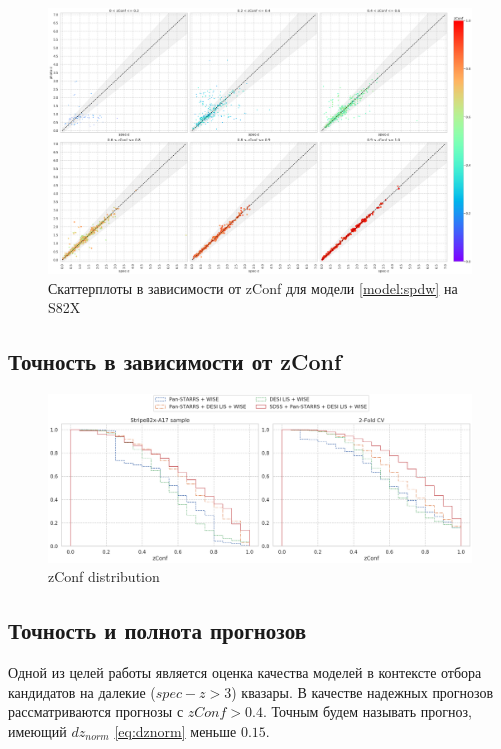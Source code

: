 \documentclass[fleqn,usenatbib]{mnras}
\begin{document}
\begin{figure}
    \centering
    \includegraphics[width=0.99\linewidth]{images/zconf-scatterplot-35-s82x.png}
    \caption{Скаттерплоты в зависимости от zConf для модели \ref{model:spdw} на S82X}
    \label{fig:zconf-scatterplot-35}
\end{figure}

\subsection{Точность в зависимости от zConf}

\begin{figure}
    \centering
    \includegraphics[width=0.9\linewidth]{images/zconf-cal.png}
    \caption{zConf distribution}
    \label{fig:zconf-cal-dr16q}
\end{figure}

\clearpage

\subsection{Точность и полнота прогнозов}\label{ssec:precision-and-completeness}

Одной из целей работы является оценка качества моделей в контексте отбора кандидатов на далекие ($spec-z > 3$) квазары. В качестве надежных прогнозов рассматриваются прогнозы с $zConf > 0.4$. Точным будем называть прогноз, имеющий $dz_{norm}$ \eqref{eq:dznorm} меньше $0.15$.
\end{document}

